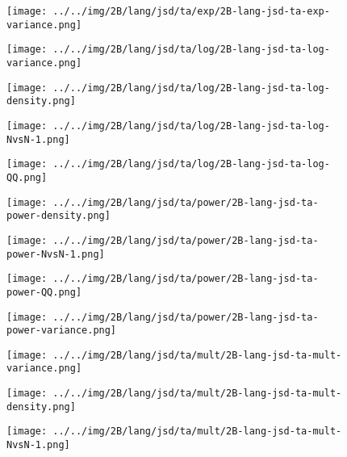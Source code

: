 \begin{figure}[H]
\centering	\texttt{[image: ../../img/2B/lang/jsd/ta/exp/2B-lang-jsd-ta-exp-variance.png]}
\end{figure}
\begin{figure}[H]
\centering	\texttt{[image: ../../img/2B/lang/jsd/ta/log/2B-lang-jsd-ta-log-variance.png]}
\end{figure}
\begin{figure}[H]
\centering	\texttt{[image: ../../img/2B/lang/jsd/ta/log/2B-lang-jsd-ta-log-density.png]}
\end{figure}
\begin{figure}[H]
\centering	\texttt{[image: ../../img/2B/lang/jsd/ta/log/2B-lang-jsd-ta-log-NvsN-1.png]}
\end{figure}
\begin{figure}[H]
\centering	\texttt{[image: ../../img/2B/lang/jsd/ta/log/2B-lang-jsd-ta-log-QQ.png]}
\end{figure}
\begin{figure}[H]
\centering	\texttt{[image: ../../img/2B/lang/jsd/ta/power/2B-lang-jsd-ta-power-density.png]}
\end{figure}
\begin{figure}[H]
\centering	\texttt{[image: ../../img/2B/lang/jsd/ta/power/2B-lang-jsd-ta-power-NvsN-1.png]}
\end{figure}
\begin{figure}[H]
\centering	\texttt{[image: ../../img/2B/lang/jsd/ta/power/2B-lang-jsd-ta-power-QQ.png]}
\end{figure}
\begin{figure}[H]
\centering	\texttt{[image: ../../img/2B/lang/jsd/ta/power/2B-lang-jsd-ta-power-variance.png]}
\end{figure}
\begin{figure}[H]
\centering	\texttt{[image: ../../img/2B/lang/jsd/ta/mult/2B-lang-jsd-ta-mult-variance.png]}
\end{figure}
\begin{figure}[H]
\centering	\texttt{[image: ../../img/2B/lang/jsd/ta/mult/2B-lang-jsd-ta-mult-density.png]}
\end{figure}
\begin{figure}[H]
\centering	\texttt{[image: ../../img/2B/lang/jsd/ta/mult/2B-lang-jsd-ta-mult-NvsN-1.png]}
\end{figure}
